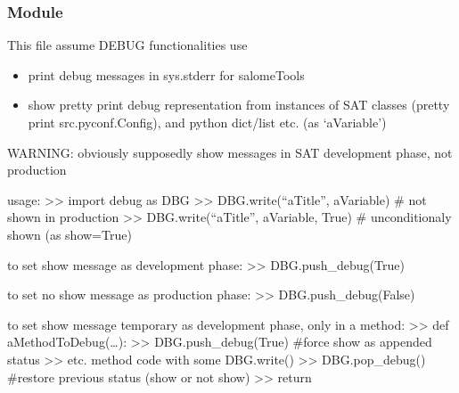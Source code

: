 \documentclass[a4paper,10pt,english]{sphinxmanual}
\begin{document}
\begin{fulllineitems}
\begin{fulllineitems}
\begin{quote}
\begin{description}
\end{description}\end{quote}

\end{fulllineitems}


\begin{fulllineitems}
\label{\detokenize{commands/apidoc/src:src.compilation.Builder.wmake}}
\end{fulllineitems}


\end{fulllineitems}



\subsubsection{ Module}
\label{\detokenize{commands/apidoc/src:module-src.debug}}\label{\detokenize{commands/apidoc/src:debug-module}}
This file assume DEBUG functionalities use
\begin{itemize}
\item {} 
print debug messages in sys.stderr for salomeTools

\item {} 
show pretty print debug representation from instances of SAT classes
(pretty print src.pyconf.Config), and python dict/list etc. (as ‘aVariable’)

\end{itemize}

WARNING: obviously supposedly show messages in SAT development phase, not production

usage:
\textgreater{}\textgreater{} import debug as DBG
\textgreater{}\textgreater{} DBG.write(“aTitle”, aVariable)        \# not shown in production 
\textgreater{}\textgreater{} DBG.write(“aTitle”, aVariable, True)  \# unconditionaly shown (as show=True)

to set show message as development phase:
\textgreater{}\textgreater{} DBG.push\_debug(True)

to set no show message as production phase:
\textgreater{}\textgreater{} DBG.push\_debug(False)

to set show message temporary as development phase, only in a method:
\textgreater{}\textgreater{} def aMethodToDebug(…):
\textgreater{}\textgreater{}   DBG.push\_debug(True)              \#force show as appended status
\textgreater{}\textgreater{}   etc. method code with some DBG.write()
\textgreater{}\textgreater{}   DBG.pop\_debug()                   \#restore previous status (show or not show)
\textgreater{}\textgreater{}   return
\end{document}
